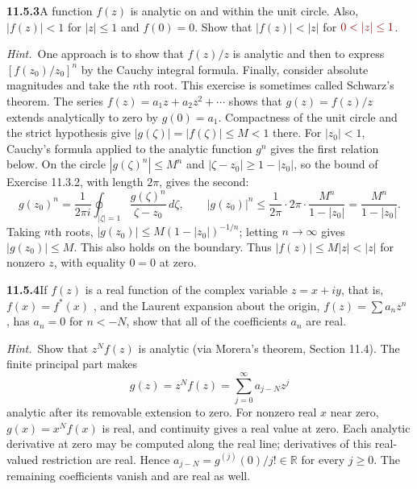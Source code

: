 \par\bigskip
\noindent\textbf{11.5.3}\quad A function $f(z)$ is analytic on and within the
unit circle. Also, $|f(z)| < 1$ for $|z| \le 1$ and $f(0)=0$. Show that
$|f(z)| < |z|$ for $\erratum{0<|z|\le1}$.

\emph{Hint.}~One approach is to show that $f(z)/z$ is analytic and then to
express $[f(z_{0})/z_{0}]^{n}$ by the Cauchy integral formula. Finally,
consider absolute magnitudes and take the $n$th root. This exercise is
sometimes called Schwarz's theorem.
\solution
{}
The series $f(z)=a_1z+a_2z^2+\cdots$ shows that
$g(z)=f(z)/z$ extends analytically to zero by $g(0)=a_1$.
Compactness of the unit circle and the strict hypothesis give
$|g(\zeta)|=|f(\zeta)|\le M<1$ there.
For $|z_0|<1$, Cauchy's formula applied to the analytic function
$g^n$ gives the first relation below. On the circle
$|g(\zeta)^n|\le M^n$ and $|\zeta-z_0|\ge1-|z_0|$, so the bound of
Exercise 11.3.2, with length $2\pi$, gives the second:
\[
g(z_0)^n=\frac1{2\pi i}\oint_{|\zeta|=1}
\frac{g(\zeta)^n}{\zeta-z_0}\,d\zeta,\qquad
|g(z_0)|^n\le\frac1{2\pi}\cdot2\pi\cdot\frac{M^n}{1-|z_0|}
=\frac{M^n}{1-|z_0|}.
\]
Taking $n$th roots, $|g(z_0)|\le M(1-|z_0|)^{-1/n}$; letting
$n\to\infty$ gives $|g(z_0)|\le M$.
This also holds on the boundary. Thus
$|f(z)|\le M|z|<|z|$ for nonzero $z$, with equality $0=0$ at zero.

\par\bigskip
\noindent\textbf{11.5.4}\quad If $f(z)$ is a real function of the complex
variable $z=x+iy$, that is, $f(x)=f^{*}(x)$ , and the Laurent expansion about
the origin, $f(z)=\sum a_{n}z^{n}$ , has $a_{n}=0$ for $n < -N$, show that all
of the coefficients $a_{n}$ are real.

\emph{Hint.}~Show that $z^{N}f(z)$ is analytic (via Morera's theorem,
Section 11.4).
\solution
{}
The finite principal part makes
\[
g(z)=z^Nf(z)=\sum_{j=0}^\infty a_{j-N}z^j
\]
analytic after its removable extension to zero.
For nonzero real $x$ near zero, $g(x)=x^Nf(x)$ is real, and
continuity gives a real value at zero. Each analytic derivative
at zero may be computed along the real line; derivatives of
this real-valued restriction are real. Hence
$a_{j-N}=g^{(j)}(0)/j!\in\mathbb R$ for every $j\ge0$.
The remaining coefficients vanish and are real as well.

